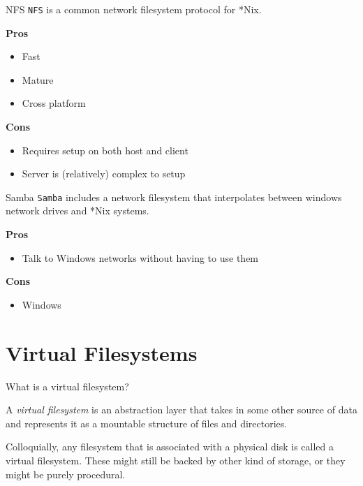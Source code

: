 \documentclass{lug}
\begin{document}
\begin{frame}{NFS}
    \texttt{NFS} is a common network filesystem protocol for *Nix.

    \textbf{Pros}
    \begin{itemize}
        \item Fast
        \item Mature
        \item Cross platform
    \end{itemize}

    \textbf{Cons}
    \begin{itemize}
        \item Requires setup on both host and client
        \item Server is (relatively) complex to setup
    \end{itemize}
\end{frame}

\begin{frame}{Samba}
\texttt{Samba} includes a network filesystem that interpolates between windows
network drives and *Nix systems. 

\textbf{Pros}
\begin{itemize}
    \item Talk to Windows networks without having to use them
\end{itemize}

\textbf{Cons}
\begin{itemize}
    \item Windows
\end{itemize}
\end{frame}

\section{Virtual Filesystems}
\begin{frame}{What is a virtual filesystem?}
\begin{center}
    A \emph{virtual filesystem} is an abstraction layer that takes in some other
    source of data and represents it as a mountable structure of files and
    directories.

    Colloquially, any filesystem that is associated with a physical disk is
    called a virtual filesystem. These might still be backed by other kind of
    storage, or they might be purely procedural.
\end{center}
\end{frame}
\end{document}
